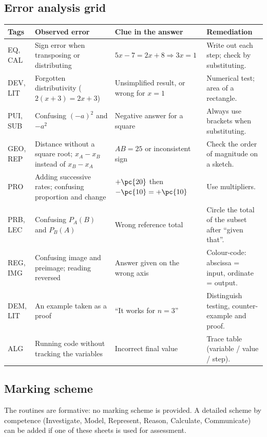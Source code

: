 \subsection*{Error analysis grid}
{\footnotesize{}
\begin{tabular}{@{}p{2.2cm} p{4.4cm} p{4.8cm} p{4.4cm}@{}}\toprule
Tags & Observed error & Clue in the answer & Remediation \\ \midrule
EQ, CAL & Sign error when transposing or distributing & $5x-7=2x+8\Rightarrow3x=1$ & Write out each step; check by substituting. \\
DEV, LIT & Forgotten distributivity ($2(x+3)=2x+3$) & Unsimplified result, or wrong for $x=1$ & Numerical test; area of a rectangle. \\
PUI, SUB & Confusing $(-a)^2$ and $-a^2$ & Negative answer for a square & Always use brackets when substituting. \\
GEO, REP & Distance without a square root; $x_A-x_B$ instead of $x_B-x_A$ & $AB=25$ or inconsistent sign & Check the order of magnitude on a sketch. \\
PRO & Adding successive rates; confusing proportion and change & $+\pc{20}$ then $-\pc{10}=+\pc{10}$ & Use multipliers. \\
PRB, LEC & Confusing $P_A(B)$ and $P_B(A)$ & Wrong reference total & Circle the total of the subset after ``given that''. \\
REG, IMG & Confusing image and preimage; reading reversed & Answer given on the wrong axis & Colour-code: abscissa = input, ordinate = output. \\
DEM, LIT & An example taken as a proof & ``It works for $n=3$'' & Distinguish testing, counter-example and proof. \\
ALG & Running code without tracking the variables & Incorrect final value & Trace table (variable / value / step). \\ \bottomrule
\end{tabular}}

\subsection*{Marking scheme}
The routines are formative: no marking scheme is provided. A detailed scheme by competence (Investigate, Model, Represent, Reason, Calculate, Communicate) can be added if one of these sheets is used for assessment.


